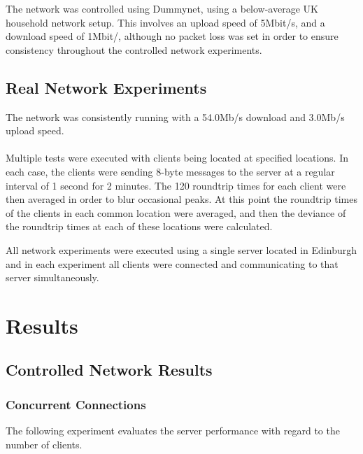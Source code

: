 \documentclass[bsc,frontabs,twoside,singlespacing,parskip,deptreport]{infthesis}     %
\begin{document}
The network was controlled using Dummynet, using a below-average UK household network setup. This involves an upload speed of 5Mbit/s, and a download speed of 1Mbit/, although no packet loss was set in order to ensure consistency throughout the controlled network experiments.

\subsection{Real Network Experiments}
The network was consistently running with a 54.0Mb/s download and 3.0Mb/s upload speed.
\paragraph{}Multiple tests were executed with clients being located at specified locations. In each case, the clients were sending 8-byte messages to the server at a regular interval of 1 second for 2 minutes. The 120 roundtrip times for each client were then averaged in order to blur occasional peaks. At this point the roundtrip times of the clients in each common location were averaged, and then the deviance of the roundtrip times at each of these locations were calculated.

All network experiments were executed using a single server located in Edinburgh and in each experiment all clients were connected and communicating to that server simultaneously.

\section{Results}
\subsection{Controlled Network Results}
\subsubsection{Concurrent Connections}
The following experiment evaluates the server performance with regard to the number of clients.
\end{document}
